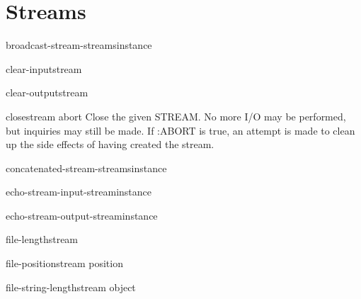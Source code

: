 \section{Streams}

\begin{function}{broadcast-stream-streams}{instance}{}{}
  
\end{function}

\begin{function}{clear-input}{\op stream}{}{}
  
\end{function}

\begin{function}{clear-output}{\op stream}{}{}
  
\end{function}

\begin{function}{close}{stream \key abort}{}{}
  Close the given STREAM. No more I/O may be performed, but
  inquiries may still be made. If :ABORT is true, an attempt is made
  to clean up the side effects of having created the stream.
\end{function}

\begin{function}{concatenated-stream-streams}{instance}{}{}
  
\end{function}

\begin{function}{echo-stream-input-stream}{instance}{}{}
  
\end{function}

\begin{function}{echo-stream-output-stream}{instance}{}{}
  
\end{function}

\begin{function}{file-length}{stream}{}{}
  
\end{function}

\begin{function}{file-position}{stream \op position}{}{}
  
\end{function}

\begin{function}{file-string-length}{stream object}{}{}
  
\end{function}

